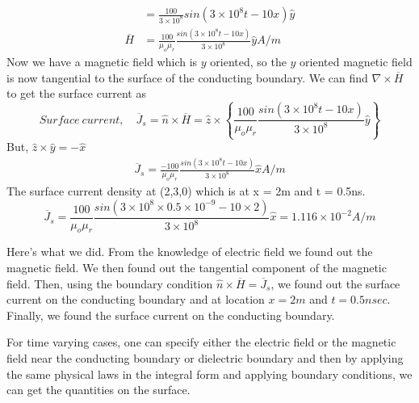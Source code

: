 \begin{exmp}
\begin{align*}
&=\frac{100}{3\times 10^8}sin(3\times 10^8t - 10x)\hat{y}\\
\overline{H} &= \frac{100}{\mu_o\mu_r}\frac{sin(3\times 10^8t -10x)}{3\times 10^8}\hat{y} A/m
\end{align*}
Now we have a magnetic field which is $y$ oriented, so the $y$ oriented magnetic field is now tangential to the surface of the conducting boundary. We can find $\nabla\times\overline{H}$ to get the surface current as
\begin{dmath*}
Surface\ current,\quad \overline{J}_s = \hat{n}\times\overline{H} = \hat{z}\times \left\lbrace \frac{100}{\mu_o\mu_r}\frac{sin(3\times 10^8t -10x)}{3\times 10^8}\hat{y} \right\rbrace  
\end{dmath*}
But, $\hat{z}\times\hat{y} = -\hat{x}$
\begin{align*}
\overline{J}_s = \frac{-100}{\mu_o\mu_r}\frac{sin(3\times 10^8t -10x)}{3\times 10^8}\hat{x} A/m
\end{align*}
The surface current density at (2,3,0) which is at x = 2m and t = 0.5ns.
\begin{dmath*}
\overline{J}_s = \frac{100}{\mu_o\mu_r}\frac{sin(3\times 10^8\times 0.5 \times 10^{-9} - 10\times 2)}{3\times 10^8}\hat{x} = 1.116\times 10^{-2} A/m
\end{dmath*}
\end{exmp} 
Here's what we did. From the knowledge of electric field we found out the magnetic field. We then found out the tangential component of the magnetic field. Then, using the boundary condition $\hat{n}\times\overline{H} = \overline{J}_s$, we found out the surface current on the conducting boundary and at location $x = 2m$ and $t = 0.5nsec$. Finally, we found the surface current on the conducting boundary.

For time varying cases, one can specify either the electric field or the magnetic field near the conducting boundary or dielectric boundary and then by applying the same physical laws in the integral form and applying boundary conditions, we can get the quantities on the surface.
